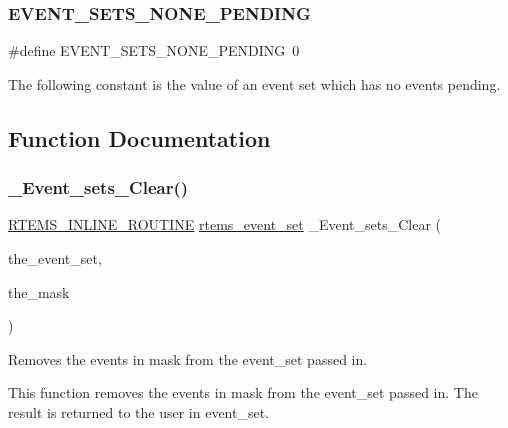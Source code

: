 \subsubsection{\texorpdfstring{EVENT\_SETS\_NONE\_PENDING}{EVENT\_SETS\_NONE\_PENDING}}
{\footnotesize\ttfamily \#define E\+V\+E\+N\+T\+\_\+\+S\+E\+T\+S\+\_\+\+N\+O\+N\+E\+\_\+\+P\+E\+N\+D\+I\+NG~0}

The following constant is the value of an event set which has no events pending. 

\subsection{Function Documentation}
\mbox{\label{group__ClassicEventImpl_gad53c0942eed159db62df6179f73417f3}} 
\subsubsection{\texorpdfstring{\_Event\_sets\_Clear()}{\_Event\_sets\_Clear()}}
{\footnotesize\ttfamily \mbox{\hyperlink{group__RTEMSScoreBaseDefs_gac216239df231d5dbd15e3520b0b9313f}{R\+T\+E\+M\+S\+\_\+\+I\+N\+L\+I\+N\+E\+\_\+\+R\+O\+U\+T\+I\+NE}} \mbox{\hyperlink{group__ClassicEventSet_gab7b8f373bea85fd4e3b7ae23905faa07}{rtems\+\_\+event\+\_\+set}} \+\_\+\+Event\+\_\+sets\+\_\+\+Clear (\begin{DoxyParamCaption}\item[{\mbox{\hyperlink{group__ClassicEventSet_gab7b8f373bea85fd4e3b7ae23905faa07}{rtems\+\_\+event\+\_\+set}}}]{the\+\_\+event\+\_\+set,  }\item[{\mbox{\hyperlink{group__ClassicEventSet_gab7b8f373bea85fd4e3b7ae23905faa07}{rtems\+\_\+event\+\_\+set}}}]{the\+\_\+mask }\end{DoxyParamCaption})}



Removes the events in mask from the event\+\_\+set passed in. 

This function removes the events in mask from the event\+\_\+set passed in. The result is returned to the user in event\+\_\+set. \mbox{\label{group__ClassicEventImpl_ga54b2878b4c9c279267030c1b4bca9083}} 
